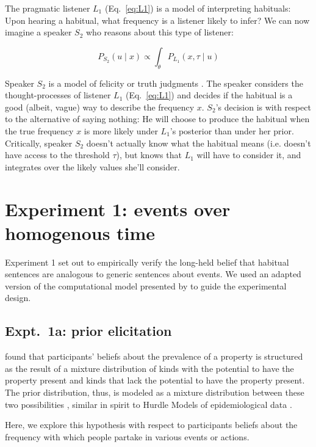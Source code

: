 \documentclass[10pt,letterpaper]{article}
\begin{document}
The pragmatic listener $L_1$ (Eq.~\ref{eq:L1}) is a model of interpreting habituals: Upon hearing a habitual, what frequency is a listener likely to infer?
We can now imagine a speaker $S_2$ who reasons about this type of listener: 

\begin{equation} 
P_{S_{2}}(u \mid x) \propto  \int_{\theta} P_{L_{1}}(x , \tau \mid u)
\label{eq:S2}
\end{equation}

Speaker $S_2$ is a model of felicity or truth judgments \cite{Degen2014, TesslerUnderReview}.
The speaker considers the thought-processes of listener $L_1$ (Eq.~\ref{eq:L1}) and decides if the habitual is a good (albeit, vague) way to describe the frequency $x$. 
$S_2$'s decision is with respect to the alternative of saying nothing: He will choose to produce the habitual when the true frequency $x$ is more likely under $L_1$'s posterior than under her prior. 
Critically, speaker $S_{2}$ doesn't actually know what the habitual means (i.e. doesn't have access to the threshold $\tau$), but knows that $L_{1}$ will have to consider it, and integrates over the likely values she'll consider.


\section{Experiment 1: events over homogenous time}

Experiment 1 set out to empirically verify the long-held belief that habitual sentences are analogous to generic sentences about events. 
We used an adapted version of the computational model presented by  to guide the experimental design.

\subsection{Expt.~1a: prior elicitation}

 found that participants' beliefs about the prevalence of a property is structured as the result of a mixture distribution of kinds with the potential to have the property present and kinds that lack the potential to have the property present.
The prior distribution, thus, is modeled as a mixture distribution between these two possibilities \cite{Griffiths2005}, similar in spirit to Hurdle Models of epidemiological data \cite{hurdleModels}.

Here, we explore this hypothesis with respect to participants beliefs about the frequency with which people partake in various events or actions.
\end{document}
